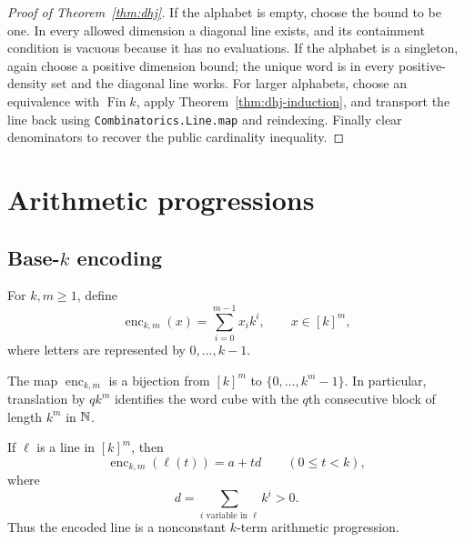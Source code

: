\begin{proof}[Proof of Theorem~\ref{thm:dhj}]
If the alphabet is empty, choose the bound to be one.  In every allowed dimension a diagonal line
exists, and its containment condition is vacuous because it has no evaluations.  If the alphabet
is a singleton, again choose a positive dimension bound; the unique word is in every
positive-density set and the diagonal line works.  For larger alphabets, choose an equivalence with
$\operatorname{Fin}k$, apply
Theorem~\ref{thm:dhj-induction}, and transport the line back using
\texttt{Combinatorics.Line.map} and reindexing.  Finally clear denominators to recover the public
cardinality inequality.
\end{proof}


\chapter{Arithmetic progressions}
\label{chap:ap}

\section{Base-$k$ encoding}

\begin{definition}
\label{def:digital-encoding}
For $k,m\geq1$, define
\[
 \operatorname{enc}_{k,m}(x)=\sum_{i=0}^{m-1}x_i k^i,
 \qquad x\in[k]^m,
\]
where letters are represented by $0,\ldots,k-1$.
\end{definition}

\begin{lemma}
\label{lem:digital-equiv}
The map $\operatorname{enc}_{k,m}$ is a bijection from $[k]^m$ to
$\{0,\ldots,k^m-1\}$.  In particular, translation by $qk^m$ identifies the word cube with the
$q$th consecutive block of length $k^m$ in $\mathbb{N}$.
\end{lemma}

\begin{lemma}
\label{lem:line-to-ap}
If $\ell$ is a line in $[k]^m$, then
\[
 \operatorname{enc}_{k,m}(\ell(t))=a+t d\qquad(0\leq t<k),
\]
where
\[
 d=\sum_{i\text{ variable in }\ell}k^i>0.
\]
Thus the encoded line is a nonconstant $k$-term arithmetic progression.
\end{lemma}

